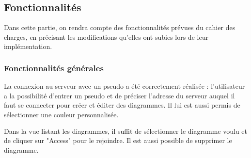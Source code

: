 \newpage
\subsection{Fonctionnalités}
Dans cette partie, on rendra compte des fonctionnalités prévues du cahier des charges, en précisant les modifications qu'elles ont subies lors de leur implémentation.

\subsubsection{Fonctionnalités générales}
La connexion au serveur avec un pseudo a été correctement réalisée : l'utilisateur a la possibilité d'entrer un pseudo et de préciser l'adresse du serveur auquel il faut se connecter pour créer et éditer des diagrammes. Il lui est aussi permis de sélectionner une couleur personnalisée.

Dans la vue listant les diagrammes, il suffit de sélectionner le diagramme voulu et de cliquer sur "Access" pour le rejoindre. Il est aussi possible de supprimer le diagramme.
		
